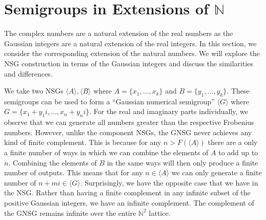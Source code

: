 \documentclass[11pt]{amsart}
\theoremstyle{plain}
\theoremstyle{definition}
\begin{document}
\section{Semigroups in Extensions of $\mathbb{N}$}
The complex numbers are a natural extension of the real numbers as the Gaussian integers are a natural extension of the real integers.
In this section, we consider the corresponding extension of the natural numbers.
We will explore the NSG construction in terms of the Gaussian integers and discuss the similarities and differences.

We take two NSGs $\langle A\rangle, \langle B\rangle$ where $A=\{x_1,\dots,x_k\}$ and $B=\{y_1,\dots,y_k\}$.
These semigroups can be used to form a ``Gaussian numerical semigroup'' $\langle G\rangle$ where $G=\{x_1+y_1i,\dots,x_n+y_ni\}$.
For the real and imaginary parts individually,
we observe that we can generate all numbers greater than the respective Frobenius numbers.
However, unlike the component NSGs, the GNSG never achieves any kind of finite complement.
This is because for any $n>F(\langle A\rangle)$ there are a only a finite number of ways in which we can combine the elements of $A$ to add up to $n$.
Combining the elements of $B$ in the same ways will then only produce a finite number of outputs.
This means that for any $n\in \langle A\rangle$ we can only generate a finite number of $n+mi\in \langle G\rangle$.
Surprisingly, we have the opposite case that we have in the NSG.
Rather than having a finite complement in any infinite subset of the positive Gaussian integers, we have an infinite complement.
The complement of the GNSG remains infinite over the entire $\mathbb{N}^2$ lattice.
\end{document}
